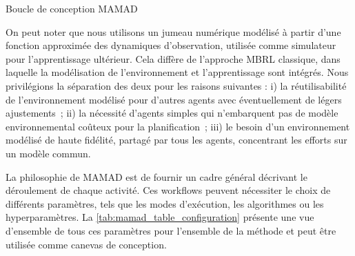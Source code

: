 \begin{algorithm}[H]
    \caption{Boucle de conception MAMAD}
    \label{alg:mamad-loop}
    \DontPrintSemicolon
\end{algorithm}

On peut noter que nous utilisons un jumeau numérique modélisé à partir d'une fonction approximée des dynamiques d'observation, utilisée comme simulateur pour l'apprentissage ultérieur. Cela diffère de l'approche MBRL classique, dans laquelle la modélisation de l'environnement et l'apprentissage sont intégrés. Nous privilégions la séparation des deux pour les raisons suivantes :
i) la réutilisabilité de l'environnement modélisé pour d'autres agents avec éventuellement de légers ajustements~;
ii) la nécessité d'agents simples qui n'embarquent pas de modèle environnemental coûteux pour la planification~;
iii) le besoin d'un environnement modélisé de haute fidélité, partagé par tous les agents, concentrant les efforts sur un modèle commun.

La philosophie de MAMAD est de fournir un cadre général décrivant le déroulement de chaque activité. Ces workflows peuvent nécessiter le choix de différents paramètres, tels que les modes d'exécution, les algorithmes ou les hyperparamètres. La \autoref{tab:mamad_table_configuration} présente une vue d'ensemble de tous ces paramètres pour l'ensemble de la méthode et peut être utilisée comme canevas de conception.

